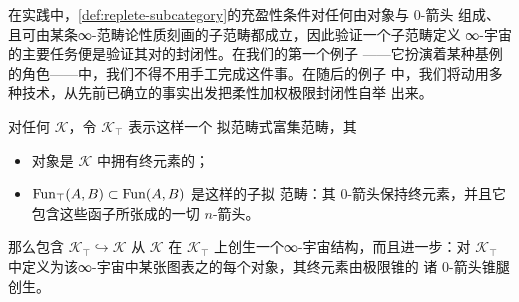 在实践中，\cref{def:replete-subcategory}的充盈性条件对任何由对象与 0-箭头
组成、且可由某条∞-范畴论性质刻画的子范畴都成立，因此验证一个子范畴定义
∞-宇宙的主要任务便是验证其对\trFlexibleWeightedLimit{}的封闭性。在我们的第一个例子
——它扮演着某种基例的角色——中，我们不得不用手工完成这件事。在随后的例子
中，我们将动用多种技术，从先前已确立的事实出发把柔性加权极限封闭性自举
出来。

\begin{proposition}\label{prop:terminal-element-cosmos}
对任何\trInfinityCosmos{} $\mathcal{K}$，令 $\mathcal{K}_{\top}$ 表示这样一个
拟范畴式富集范畴，其
\begin{itemize}
\item[(i)] 对象是 $\mathcal{K}$ 中拥有终元素的\trInfinityCategory{}；
\item[(ii)] \trFunctorSpace{} $\operatorname{Fun}_{\top}(A,B)\subset\operatorname{Fun}(A,B)$ 是这样的子拟
范畴：其 0-箭头保持终元素，并且它包含这些函子所张成的一切 $n$-箭头。
\end{itemize}
那么包含 $\mathcal{K}_{\top}\hookrightarrow\mathcal{K}$ 从 $\mathcal{K}$ 在
$\mathcal{K}_{\top}$ 上创生一个∞-宇宙结构，而且进一步：对 $\mathcal{K}_{\top}$
中定义为该∞-宇宙中某张图表之\trFlexibleWeightedLimit{}的每个对象，其终元素由极限锥的
诸 0-箭头锥腿创生。
\end{proposition}


